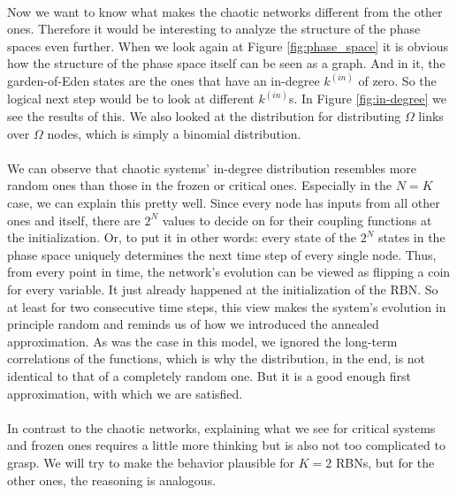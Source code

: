 \paragraph*{}
Now we want to know what makes the chaotic networks different from the other ones. Therefore it would be interesting to analyze the structure of the phase spaces even further. When we look again at Figure \ref{fig:phase_space} it is obvious how the structure of the phase space itself can be seen as a graph. And in it, the garden-of-Eden states are the ones that have an in-degree $k^{(in)}$ of zero. So the logical next step would be to look at different $k^{(in)}$s. In Figure \ref{fig:in-degree} we see the results of this. We also looked at the distribution for distributing $\Omega$ links over $\Omega$ nodes, which is simply a binomial distribution.

\paragraph*{}
We can observe that chaotic systems' in-degree distribution resembles more random ones than those in the frozen or critical ones. Especially in the $N=K$ case, we can explain this pretty well. Since every node has inputs from all other ones and itself, there are $2^N$ values to decide on for their coupling functions at the initialization. Or, to put it in other words: every state of the $2^N$ states in the phase space uniquely determines the next time step of every single node. Thus, from every point in time, the network's evolution can be viewed as flipping a coin for every variable. It just already happened at the initialization of the RBN. So at least for two consecutive time steps, this view makes the system's evolution in principle random and reminds us of how we introduced the annealed approximation. As was the case in this model, we ignored the long-term correlations of the functions, which is why the distribution, in the end, is not identical to that of a completely random one. But it is a good enough first approximation, with which we are satisfied.

\paragraph*{}
In contrast to the chaotic networks, explaining what we see for critical systems and frozen ones requires a little more thinking but is also not too complicated to grasp. We will try to make the behavior plausible for $K=2$ RBNs, but for the other ones, the reasoning is analogous. 


